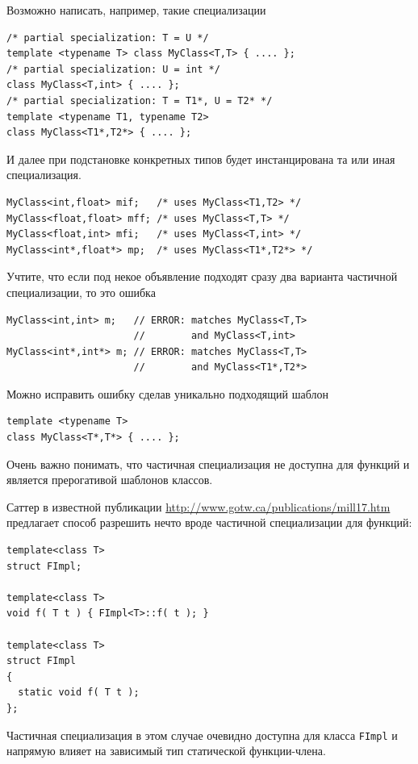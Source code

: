\documentclass[a4paper,12pt,oneside]{article}
\begin{document}
Возможно написать, например, такие специализации

\begin{lstlisting}
/* partial specialization: T = U */ 
template <typename T> class MyClass<T,T> { .... }; 
/* partial specialization: U = int */ 
class MyClass<T,int> { .... }; 
/* partial specialization: T = T1*, U = T2* */
template <typename T1, typename T2> 
class MyClass<T1*,T2*> { .... };
\end{lstlisting}

И далее при подстановке конкретных типов будет инстанцирована та или иная специализация.

\begin{lstlisting}
MyClass<int,float> mif;   /* uses MyClass<T1,T2> */ 
MyClass<float,float> mff; /* uses MyClass<T,T> */ 
MyClass<float,int> mfi;   /* uses MyClass<T,int> */ 
MyClass<int*,float*> mp;  /* uses MyClass<T1*,T2*> */
\end{lstlisting}

Учтите, что если под некое объявление подходят сразу два варианта частичной специализации, то это ошибка

\begin{lstlisting}
MyClass<int,int> m;   // ERROR: matches MyClass<T,T> 
                      //        and MyClass<T,int> 
MyClass<int*,int*> m; // ERROR: matches MyClass<T,T> 
                      //        and MyClass<T1*,T2*>
\end{lstlisting}

Можно исправить ошибку сделав уникально подходящий шаблон

\begin{lstlisting}
template <typename T> 
class MyClass<T*,T*> { .... };
\end{lstlisting}

Очень важно понимать, что частичная специализация не доступна для функций и является прерогативой шаблонов классов.

Саттер в известной публикации \url{http://www.gotw.ca/publications/mill17.htm} предлагает способ разрешить нечто вроде частичной специализации для функций:

\begin{lstlisting}
template<class T> 
struct FImpl;

template<class T> 
void f( T t ) { FImpl<T>::f( t ); } 

template<class T> 
struct FImpl 
{ 
  static void f( T t ); 
};
\end{lstlisting}

Частичная специализация в этом случае очевидно доступна для класса \lstinline!FImpl! и напрямую влияет на зависимый тип статической функции-члена.
\end{document}
